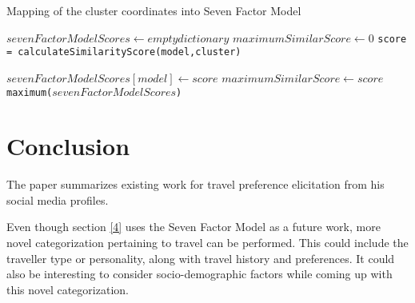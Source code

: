 \begin{algorithm}\label{algo:ProclivityProp2}
\caption{Mapping of the cluster coordinates into Seven Factor Model}
\begin{algorithmic}
  \Input
  \EndInput
  \Output
  \EndOutput
         
          \State $sevenFactorModelScores\gets {empty dictionary}$
          \State $maximumSimilarScore\gets 0$
            \State \texttt{score = calculateSimilarityScore(model,cluster)}
       
                    \State $sevenFactorModelScores[model]\gets {score}$
                    \State $maximumSimilarScore\gets score$\;
            \EndIf
          \EndFor
    \EndFor \\
    \Return \texttt{maximum($sevenFactorModelScores$)}
    \newline
    \EndProcedure
\end{algorithmic}
\end{algorithm}


\section{Conclusion}
The paper summarizes existing work for travel preference elicitation from his social media profiles. 

Even though section \ref{4} uses the Seven Factor Model \cite{sertkan2018mapping} as a future work, more novel categorization pertaining to travel can be performed. This could include the traveller type or personality, along with travel history and preferences. It could also be interesting to consider socio-demographic factors while coming up with this novel categorization.

